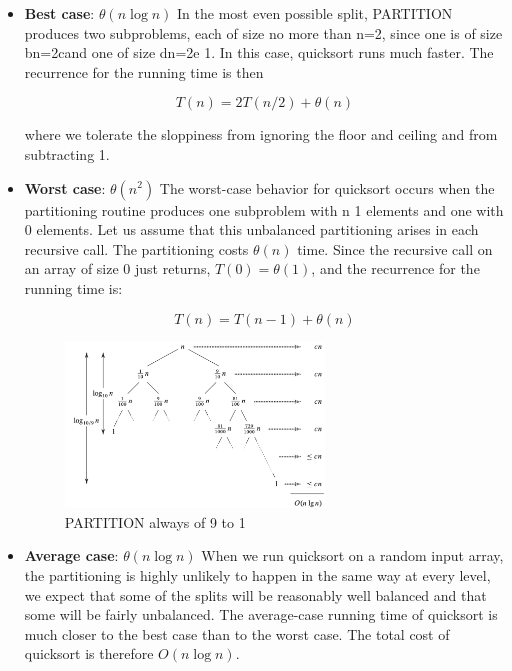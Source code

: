 \begin{itemize}
    \item \textbf{Best case}: $\theta(n\log n)$ \newline
    In the most even possible split, PARTITION produces two subproblems, each of size no more than n=2, since one is of size bn=2cand one of size dn=2e 1. In this case, quicksort runs much faster. The recurrence for the running time is then
    
    $$
    T(n) = 2T(n/2) + \theta(n)
    $$

    where we tolerate the sloppiness from ignoring the floor and ceiling and from subtracting 1.

    \item \textbf{Worst case}: $\theta(n^2)$ \newline
    The worst-case behavior for quicksort occurs when the partitioning routine produces one subproblem with n 1 elements and one with 0 elements. Let us assume that this unbalanced partitioning arises in each recursive call. The partitioning costs $\theta (n)$ time. Since the recursive call on an array of size 0 just returns, $T(0) = \theta(1)$, and the recurrence for the running time is:

    $$
    T(n) = T(n-1) + \theta(n)
    $$

    \begin{figure}[H]
        \centering
        \includegraphics[width=0.65\textwidth]{assets/quicksort_avg_case.png}
        \caption{PARTITION always of 9 to 1 \cite{cormen2022introduction}}
    \end{figure}

    \item \textbf{Average case}: $\theta(n\log n)$ \newline 
    When we run quicksort on a random input array, the partitioning is highly unlikely to happen in the same way at every level, we expect that some of the splits will be reasonably well balanced and that some will be fairly unbalanced. The average-case running time of quicksort is much closer to the best case than to the worst case. The total cost of quicksort is therefore $O(n\log n)$.
\end{itemize}

